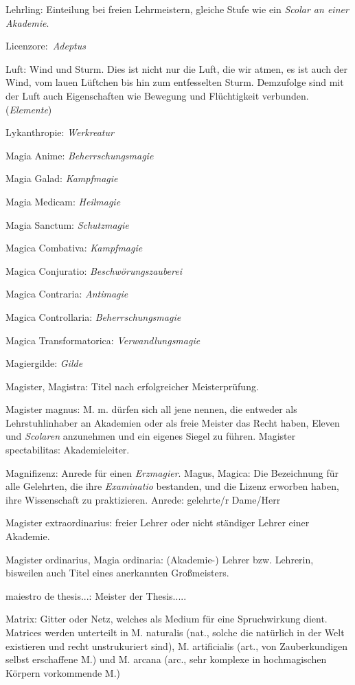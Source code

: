 \documentclass[a5paper,8pt]{book}
\begin{document}
\begin{small}
\begin{description}
 \item Lehrling: Einteilung bei freien Lehrmeistern, gleiche Stufe wie ein \textit{Scolar an einer Akademie}.
 \item Licenzore: \textit{Adeptus}
 \item Luft: Wind und Sturm. Dies ist nicht nur die Luft, die wir atmen, es ist auch der Wind, vom lauen Lüftchen bis hin zum entfesselten Sturm. Demzufolge sind mit der 
Luft auch Eigenschaften wie Bewegung und Flüchtigkeit verbunden. (\textit{Elemente})
 \item Lykanthropie: \textit{Werkreatur}
 \item Magia Anime: \textit{Beherrschungsmagie}
 \item Magia Galad: \textit{Kampfmagie}
 \item Magia Medicam: \textit{Heilmagie}
 \item Magia Sanctum: \textit{Schutzmagie}
 \item Magica Combativa: \textit{Kampfmagie}
 \item Magica Conjuratio: \textit{Beschwörungszauberei}
 \item Magica Contraria: \textit{Antimagie}
 \item Magica Controllaria: \textit{Beherrschungsmagie}
 \item Magica Transformatorica: \textit{Verwandlungsmagie}
 \item Magiergilde: \textit{Gilde}
 \item Magister, Magistra: Titel nach erfolgreicher Meisterprüfung.
 \item Magister magnus: M. m. dürfen sich all jene nennen, die entweder als Lehrstuhlinhaber an Akademien oder als freie Meister das Recht haben, Eleven und 
\textit{Scolaren} anzunehmen und ein eigenes Siegel zu führen.
Magister spectabilitas: Akademieleiter.
 \item Magnifizenz: Anrede für einen \textit{Erzmagier}.
Magus, Magica: Die Bezeichnung für alle Gelehrten, die ihre \textit{Examinatio} bestanden, und die Lizenz erworben haben, ihre Wissenschaft zu praktizieren. Anrede:
gelehrte/r Dame/­Herr
 \item Magister extraordinarius: freier Lehrer oder nicht ständiger Lehrer einer Akademie.
 \item Magister ordinarius, Magia ordinaria: (Akademie-) Lehrer bzw. Lehrerin, bisweilen auch Titel eines an­erkan­nten Großmeisters.
 \item maiestro de thesis...: Meister der Thesis.....
 \item Matrix: Gitter oder Netz, welches als Medium für eine Spruch­wirkung dient. Matrices werden unterteilt in M. naturalis (nat., solche die natürlich in der Welt existieren und recht unstrukuriert sind), M. artificialis (art., von Zauberkundigen selbst erschaffene M.) und M. arcana (arc., sehr komplexe in hochmagischen Körpern vor­kommende M.)

\end{description}
\end{small}
\end{document}
